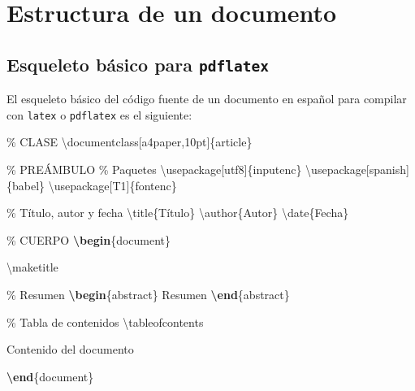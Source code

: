 \documentclass[
  a4paper,
]{scrreport}
\newenvironment{Shaded}{\begin{snugshade}}{\end{snugshade}}
\newcommand{\BuiltInTok}[1]{\textcolor[rgb]{0.00,0.23,0.31}{#1}}
\newcommand{\CommentTok}[1]{\textcolor[rgb]{0.37,0.37,0.37}{#1}}
\newcommand{\ExtensionTok}[1]{\textcolor[rgb]{0.00,0.23,0.31}{#1}}
\newcommand{\FunctionTok}[1]{\textcolor[rgb]{0.28,0.35,0.67}{#1}}
\newcommand{\KeywordTok}[1]{\textcolor[rgb]{0.00,0.23,0.31}{\textbf{#1}}}
\newcommand{\NormalTok}[1]{\textcolor[rgb]{0.00,0.23,0.31}{#1}}
\theoremstyle{definition}
\theoremstyle{remark}
\begin{document}

\chapter{Estructura de un documento}\label{estructura-de-un-documento}

\section{\texorpdfstring{Esqueleto básico para
\texttt{pdflatex}}{Esqueleto básico para pdflatex}}\label{esqueleto-buxe1sico-para-pdflatex}

El esqueleto básico del código fuente de un documento en español para
compilar con \texttt{latex} o \texttt{pdflatex} es el siguiente:

\begin{Shaded}
\begin{Highlighting}[]
\CommentTok{\% CLASE}
\BuiltInTok{\textbackslash{}documentclass}\NormalTok{[a4paper,10pt]\{}\ExtensionTok{article}\NormalTok{\}}

\CommentTok{\% PREÁMBULO}
\CommentTok{\% Paquetes}
\BuiltInTok{\textbackslash{}usepackage}\NormalTok{[utf8]\{}\ExtensionTok{inputenc}\NormalTok{\}}
\BuiltInTok{\textbackslash{}usepackage}\NormalTok{[spanish]\{}\ExtensionTok{babel}\NormalTok{\}}
\BuiltInTok{\textbackslash{}usepackage}\NormalTok{[T1]\{}\ExtensionTok{fontenc}\NormalTok{\}}

\CommentTok{\% Título, autor y fecha}
\FunctionTok{\textbackslash{}title}\NormalTok{\{Título\}}
\FunctionTok{\textbackslash{}author}\NormalTok{\{Autor\}}
\FunctionTok{\textbackslash{}date}\NormalTok{\{Fecha\}}

\CommentTok{\% CUERPO}
\KeywordTok{\textbackslash{}begin}\NormalTok{\{}\ExtensionTok{document}\NormalTok{\}}

\FunctionTok{\textbackslash{}maketitle}

\CommentTok{\% Resumen}
\KeywordTok{\textbackslash{}begin}\NormalTok{\{}\ExtensionTok{abstract}\NormalTok{\}}
\NormalTok{Resumen}
\KeywordTok{\textbackslash{}end}\NormalTok{\{}\ExtensionTok{abstract}\NormalTok{\}}

\CommentTok{\% Tabla de contenidos}
\FunctionTok{\textbackslash{}tableofcontents}

\NormalTok{Contenido del documento}

\KeywordTok{\textbackslash{}end}\NormalTok{\{}\ExtensionTok{document}\NormalTok{\}}
\end{Highlighting}
\end{Shaded}
\end{document}
